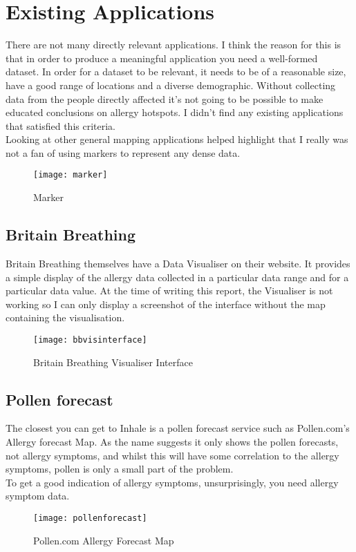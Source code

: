 \section{Existing Applications}
\label{sec:diagrams}

There are not many directly relevant applications. I think the reason for this is that in order to produce a meaningful application you need a well-formed dataset. In order for a dataset to be relevant, it needs to be of a reasonable size, have a good range of locations and a diverse demographic. Without collecting data from the people directly affected it's not going to be possible to make educated conclusions on allergy hotspots. I didn't find any existing applications that satisfied this criteria.\\

Looking at other general mapping applications helped highlight that I really was not a fan of using markers to represent any dense data.

\begin{figure}[H]
\centering
\texttt{[image: marker]}
\caption{Marker}\label{fig:marker}
\end{figure}



\subsection{Britain Breathing}
Britain Breathing themselves have a Data Visualiser on their website. It provides a simple display of the allergy data collected in a particular data range and for a particular data value. At the time of writing this report, the Visualiser is not working so I can only display a screenshot of the interface without the map containing the visualisation.

\begin{figure}[H]
\begin{center}
\texttt{[image: bbvisinterface]}
\caption{Britain Breathing Visualiser Interface}
\end{center}
\end{figure}

\subsection{Pollen forecast}

The closest you can get to Inhale is a pollen forecast service such as Pollen.com's Allergy forecast Map. As the name suggests it only shows the pollen forecasts, not allergy symptoms, and whilst this will have some correlation to the allergy symptoms, pollen is only a small part of the problem.\\

To get a good indication of allergy symptoms, unsurprisingly, you need allergy symptom data.\\

\begin{figure}[H]
\begin{center}
\texttt{[image: pollenforecast]}
\caption{Pollen.com Allergy Forecast Map}
\end{center}
\end{figure}